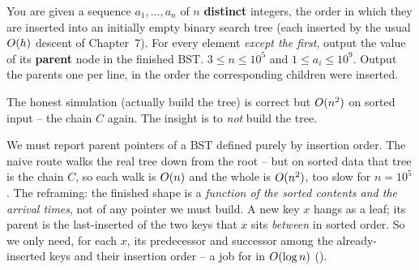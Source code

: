 \begin{problemstatement}
You are given a sequence $a_1,\dots,a_n$ of $n$ \textbf{distinct} integers, the order in which they
are inserted into an initially empty binary search tree (each inserted by the usual
$O(h)$ descent of Chapter~7). For every element \emph{except the first}, output the value of its
\textbf{parent} node in the finished BST. $3\le n\le 10^{5}$ and $1\le a_i\le 10^{9}$. Output the
parents one per line, in the order the corresponding children were inserted.
\end{problemstatement}

\begin{attemptgate}
The honest simulation (actually build the tree) is correct but $O(n^2)$ on sorted input -- the
chain $C$ again. The insight is to \emph{not} build the tree.
\end{attemptgate}

We must report parent pointers of a BST defined purely by insertion order. The naive route walks the
real tree down from the root -- but on sorted data that tree is the chain $C$, so each walk is
$O(n)$ and the whole is $O(n^2)$, too slow for $n=10^{5}$. The reframing: the finished shape
is a \emph{function of the sorted contents and the arrival times}, not of any pointer we must build.
A new key $x$ hangs as a leaf; its parent is the last-inserted of the two keys that $x$ sits
\emph{between} in sorted order. So we only need, for each $x$, its predecessor and successor among the
already-inserted keys and their insertion order -- a job for  in $O(\log n)$
().


